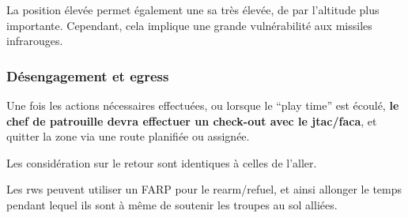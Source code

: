 	    \item
	    La position élevée permet également une \gls{sa} très élevée, de par l'altitude plus importante. Cependant, cela implique une grande vulnérabilité aux missiles infrarouges.
	\ed
\ed

\subsubsection{Désengagement et egress}

\e
    \item
    Une fois les actions nécessaires effectuées, ou lorsque le “play time” est écoulé, \textbf{le chef de patrouille devra effectuer un check-out avec le \gls{jtac}/\gls{faca}}, et quitter la zone via une route planifiée ou assignée.
    \item Les considération sur le retour sont identiques à celles de l'aller.
    \item Les \gls{rw}s peuvent utiliser un FARP pour le rearm/refuel, et ainsi allonger le temps pendant lequel ils sont à même de soutenir les troupes au sol alliées.

    \item {}

\ed

